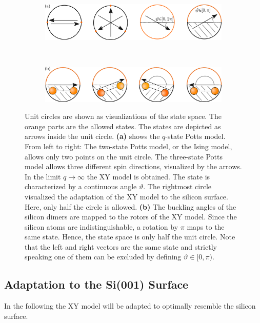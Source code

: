 		\begin{figure}[htp]
			\centering
		\begin{subfigure}{\textwidth}
			\centering
			\includegraphics[width=0.9\linewidth]{graphics/Allowed-States.png}
		\end{subfigure} \\
		\par\bigskip %
		\begin{subfigure}{\textwidth}
			\centering
			\includegraphics[width=0.9\linewidth]{graphics/State-Mapping.png}
		\end{subfigure}
		\caption{Unit circles are shown as visualizations of the state space. The orange parts are the allowed states. The states are depicted as arrows inside the unit circle. \textbf{(a)} shows the $q$-state Potts model. From left to right: The two-state Potts model, or the Ising model, allows only two points on the unit circle.  The three-state Potts model allows three different spin directions, visualized by the arrows. In the limit $q \rightarrow \infty$ the XY model is obtained. The state is characterized by a continuous angle $\vartheta$. The rightmost circle visualized the adaptation of the XY model to the silicon surface. Here, only half the circle is allowed. \textbf{(b)} The buckling angles of the silicon dimers are mapped to the rotors of the XY model. Since the silicon atoms are indistinguishable, a rotation by $\pi$ maps to the same state. Hence, the state space is only half the unit circle. Note that the left and right vectors are the same state and strictly speaking one of them can be excluded by defining $\vartheta \in [0, \pi)$.}
		\label{Fig::States}
	\end{figure}
	\subsection{Adaptation to the Si(001) Surface}\label{Sec::XY-to-Silicon}	
	In the following the XY model will be adapted to optimally resemble the silicon surface. \\ 	%
	
